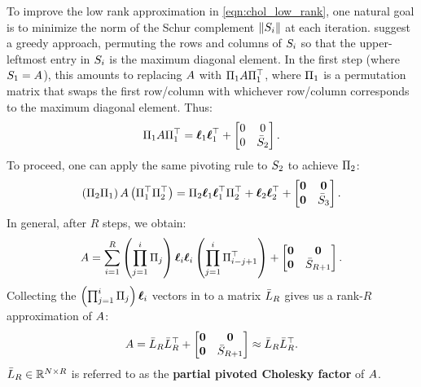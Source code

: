 To improve the low rank approximation in \cref{eqn:chol_low_rank}, one natural goal is to minimize the norm of the Schur complement $\Vert S_{i} \Vert$ at each iteration.
\citet{harbrecht2012low} suggest a greedy approach, permuting the rows and columns of $S_{i}$ so that the upper-leftmost entry in $S_{i}$ is the maximum diagonal element.
In the first step (where $S_1 = A$), this amounts to replacing $A$ with $\Pi_{1} A \Pi_{1}^\top$, where $\Pi_{1}$ is a permutation matrix that swaps the first row/column with whichever row/column corresponds to the maximum diagonal element.
Thus:
%
\begin{align*}
  \Pi_{1} A \Pi_{1}^\top = \boldsymbol{\ell}_{1}\boldsymbol{\ell}_{1}^{\top} + \begin{bmatrix} 0 & 0 \\ 0 & \bar {S}_2 \end{bmatrix}.
\end{align*}
%
To proceed, one can apply the same pivoting rule to $S_2$ to achieve $\Pi_{2}$:
%
\begin{align*}
  \left( \Pi_{2} \Pi_{1} \right) A \left( \Pi_{1}^\top \Pi_{2}^\top \right) = \Pi_{2} \boldsymbol{\ell}_{1}\boldsymbol{\ell}_{1}^{\top} \Pi_2^\top
  + \boldsymbol{\ell}_2 \boldsymbol{\ell}_2^\top + \begin{bmatrix} \mathbf{0} & \mathbf{0} \\ \mathbf{0} & \bar {S}_3 \end{bmatrix}.
\end{align*}
%
In general, after $R$ steps, we obtain:
\begin{align}
  A = \sum_{i=1}^{R} \left( \prod_{j=1}^i \Pi_j \right) {\boldsymbol{\ell}}_{i} {\boldsymbol{\ell}}_{i} \left( \prod_{j=1}^i \Pi_{i-j+1}^\top \right)
  + \begin{bmatrix} \mathbf{0} & \mathbf{0} \\ \mathbf{0} & \bar {S}_{R+1} \end{bmatrix}.
\end{align}
Collecting the $\left( \prod_{j=1}^i \Pi_j \right) {\boldsymbol{\ell}}_{i}$ vectors in to a matrix $\bar{L}_R$ gives us a rank-$R$ approximation of $A$:
%
\begin{equation}
  A = \bar{L}_{R} \bar{L}_{R}^{\top} + \begin{bmatrix} \mathbf{0} & \mathbf{0} \\ \mathbf{0} & \bar {S}_{R+1} \end{bmatrix} \approx \bar{L}_{R} \bar{L}_{R}^{\top}.
  \label{eqn:chol_error}
\end{equation}
%
$\bar{L}_{R} \in \mathbb{R}^{N \times R}$ is referred to as the {\bf partial pivoted Cholesky factor} of $A$.


